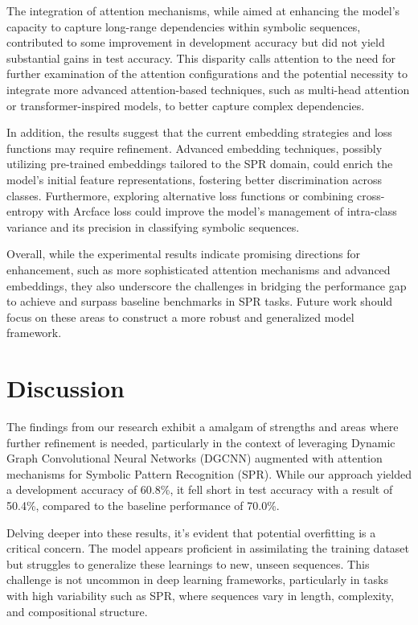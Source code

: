 \documentclass{article}
\begin{document}
The integration of attention mechanisms, while aimed at enhancing the model's capacity to capture long-range dependencies within symbolic sequences, contributed to some improvement in development accuracy but did not yield substantial gains in test accuracy. This disparity calls attention to the need for further examination of the attention configurations and the potential necessity to integrate more advanced attention-based techniques, such as multi-head attention or transformer-inspired models, to better capture complex dependencies.

In addition, the results suggest that the current embedding strategies and loss functions may require refinement. Advanced embedding techniques, possibly utilizing pre-trained embeddings tailored to the SPR domain, could enrich the model's initial feature representations, fostering better discrimination across classes. Furthermore, exploring alternative loss functions or combining cross-entropy with Arcface loss could improve the model's management of intra-class variance and its precision in classifying symbolic sequences.

Overall, while the experimental results indicate promising directions for enhancement, such as more sophisticated attention mechanisms and advanced embeddings, they also underscore the challenges in bridging the performance gap to achieve and surpass baseline benchmarks in SPR tasks. Future work should focus on these areas to construct a more robust and generalized model framework.
\section{Discussion}
The findings from our research exhibit a amalgam of strengths and areas where further refinement is needed, particularly in the context of leveraging Dynamic Graph Convolutional Neural Networks (DGCNN) augmented with attention mechanisms for Symbolic Pattern Recognition (SPR). While our approach yielded a development accuracy of 60.8\%, it fell short in test accuracy with a result of 50.4\%, compared to the baseline performance of 70.0\%. 

Delving deeper into these results, it's evident that potential overfitting is a critical concern. The model appears proficient in assimilating the training dataset but struggles to generalize these learnings to new, unseen sequences. This challenge is not uncommon in deep learning frameworks, particularly in tasks with high variability such as SPR, where sequences vary in length, complexity, and compositional structure.
\end{document}
